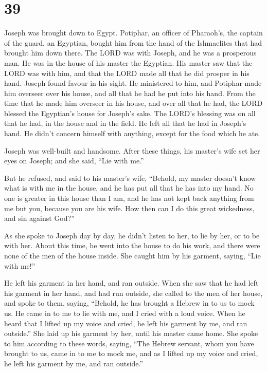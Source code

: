 \hypertarget{section-38}{%
\section{39}\label{section-38}}

 Joseph was brought down to Egypt. Potiphar, an officer of
Pharaoh's, the captain of the guard, an Egyptian, bought him from the
hand of the Ishmaelites that had brought him down there. 
The LORD was with Joseph, and he was a prosperous man. He was in the
house of his master the Egyptian.  His master saw that the
LORD was with him, and that the LORD made all that he did prosper in his
hand.  Joseph found favour in his sight. He ministered to
him, and Potiphar made him overseer over his house, and all that he had
he put into his hand.  From the time that he made him
overseer in his house, and over all that he had, the LORD blessed the
Egyptian's house for Joseph's sake. The LORD's blessing was on all that
he had, in the house and in the field.  He left all that he
had in Joseph's hand. He didn't concern himself with anything, except
for the food which he ate.

Joseph was well-built and handsome.  After these things, his
master's wife set her eyes on Joseph; and she said, ``Lie with me.''

 But he refused, and said to his master's wife, ``Behold, my
master doesn't know what is with me in the house, and he has put all
that he has into my hand.  No one is greater in this house
than I am, and he has not kept back anything from me but you, because
you are his wife. How then can I do this great wickedness, and sin
against God?''

 As she spoke to Joseph day by day, he didn't listen to
her, to lie by her, or to be with her.  About this time, he
went into the house to do his work, and there were none of the men of
the house inside.  She caught him by his garment, saying,
``Lie with me!''

He left his garment in her hand, and ran outside.  When she
saw that he had left his garment in her hand, and had run outside,
 she called to the men of her house, and spoke to them,
saying, ``Behold, he has brought a Hebrew in to us to mock us. He came
in to me to lie with me, and I cried with a loud voice. 
When he heard that I lifted up my voice and cried, he left his garment
by me, and ran outside.''  She laid up his garment by her,
until his master came home.  She spoke to him according to
these words, saying, ``The Hebrew servant, whom you have brought to us,
came in to me to mock me,  and as I lifted up my voice and
cried, he left his garment by me, and ran outside.''

